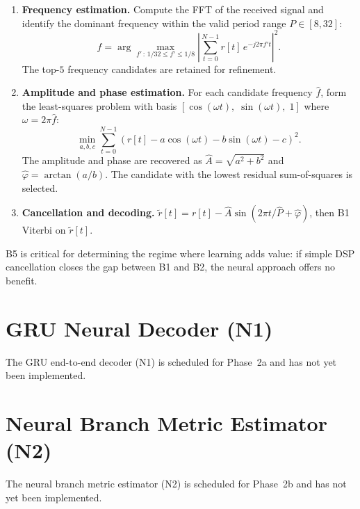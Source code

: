\documentclass[11pt,a4paper]{article}
\begin{document}
\begin{enumerate}
  \item \textbf{Frequency estimation.} Compute the FFT of the received signal and identify the dominant frequency within the valid period range $P \in [8, 32]$:
  \begin{equation}
    \hat{f} = \arg\max_{f'\,:\, 1/32 \leq f' \leq 1/8} \left|\sum_{t=0}^{N-1} r[t]\, e^{-j2\pi f' t}\right|^2.
  \end{equation}
  The top-$5$ frequency candidates are retained for refinement.

  \item \textbf{Amplitude and phase estimation.} For each candidate frequency $\hat{f}$, form the least-squares problem with basis $[\cos(\omega t),\; \sin(\omega t),\; 1]$ where $\omega = 2\pi\hat{f}$:
  \begin{equation}
    \min_{a,b,c} \sum_{t=0}^{N-1}
      \!\left(r[t] - a\cos(\omega t) - b\sin(\omega t) - c\right)^2.
  \end{equation}
  The amplitude and phase are recovered as $\hat{A} = \sqrt{a^2 + b^2}$ and $\hat{\varphi} = \arctan(a/b)$. The candidate with the lowest residual sum-of-squares is selected.

  \item \textbf{Cancellation and decoding.}
  $\tilde{r}[t] = r[t] - \hat{A}\sin(2\pi t/\hat{P} + \hat{\varphi})$, then B1 Viterbi on $\tilde{r}[t]$.
\end{enumerate}

B5 is critical for determining the regime where learning adds value: if simple DSP cancellation closes the gap between B1 and B2, the neural approach offers no benefit.

\section{GRU Neural Decoder (N1)}

The GRU end-to-end decoder (N1) is scheduled for Phase~2a and has not yet been implemented.

\section{Neural Branch Metric Estimator (N2)}

The neural branch metric estimator (N2) is scheduled for Phase~2b and has not yet been implemented.
\end{document}
